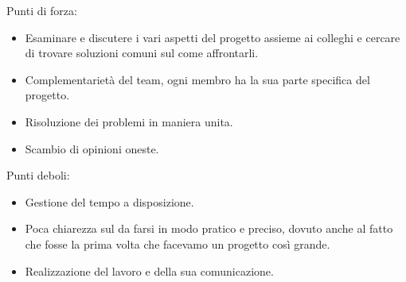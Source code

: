 \begin{flushleft}
	
	\textsf{\small Punti di forza:}\\
	
	\begin{itemize}
		\item \textsf{\small Esaminare e discutere i vari aspetti del progetto assieme ai colleghi e cercare di trovare soluzioni comuni sul come affrontarli. }
		\item \textsf{\small Complementarietà del team, ogni membro ha la sua parte specifica del progetto.}
		\item \textsf{\small Risoluzione dei problemi in maniera unita.}
		\item \textsf{\small Scambio di opinioni oneste.}
	\end{itemize}
	
	\textsf{\small Punti deboli: }\\
	
	\begin{itemize}
		\item \textsf{\small Gestione del tempo a disposizione.}
		\item \textsf{\small Poca chiarezza sul da farsi in modo pratico e preciso, dovuto anche al fatto che fosse la prima volta che facevamo un progetto così grande.}
		\item \textsf{\small Realizzazione del lavoro e della sua comunicazione.}
	\end{itemize}
	
\end{flushleft}

\begin{comment}
\textbf{È richiesta una sezione per ciascun membro del gruppo, obbligatoriamente}.
%
Ciascuno dovrà autovalutare il proprio lavoro, elencando i punti di forza e di debolezza in quanto prodotto.
Si dovrà anche cercare di descrivere \emph{in modo quanto più obiettivo possibile} il proprio ruolo all'interno del gruppo.
Si ricorda, a tal proposito, che ciascuno studente è responsabile solo della propria sezione: non è un problema se ci sono opinioni contrastanti, a patto che rispecchino effettivamente l'opinione di chi le scrive.
Nel caso in cui si pensasse di portare avanti il progetto, ad esempio perché effettivamente impiegato, o perché sufficientemente ben riuscito da poter esser usato come dimostrazione di esser capaci progettisti, si descriva brevemente verso che direzione portarlo.
\end{comment}

